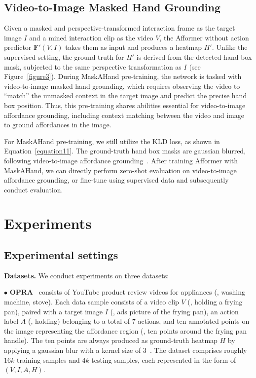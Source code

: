 \documentclass[10pt,twocolumn,letterpaper]{article}
\begin{document}
\subsection{Video-to-Image Masked Hand Grounding}

Given a masked and perspective-transformed interaction frame as the target image $I$ and a mined interaction clip as the video $V$, the Afformer without action predictor $\boldsymbol{F}'(V, I)$ takes them as input and produces a heatmap $H'$. Unlike the supervised setting, the ground truth for $H'$ is derived from the detected hand box mask, subjected to the same perspective transformation as $I$ (see Figure~\ref{figure3}). During MaskAHand pre-training, the network is tasked with video-to-image masked hand grounding, which requires observing the video to ``match'' the unmasked context in the target image and predict the precise hand box position. Thus, this pre-training shares abilities essential for video-to-image affordance grounding, including context matching between the video and image to ground affordances in the image.

For MaskAHand pre-training, we still utilize the KLD loss, as shown in Equation~\ref{equation11}. The ground-truth hand box masks are gaussian blurred, following video-to-image affordance grounding~\cite{demo2vec}. After training Afformer with MaskAHand, we can directly perform zero-shot evaluation on video-to-image affordance grounding, or fine-tune using supervised data and subsequently conduct evaluation.

\section{Experiments}

\subsection{Experimental settings}

\noindent\textbf{Datasets.} We conduct experiments on three datasets:

\noindent
$\bullet$ \textbf{OPRA}~\cite{demo2vec} consists of YouTube product review videos for appliances (\eg, washing machine, stove). Each data sample consists of a video clip $V$ (\eg, holding a frying pan), paired with a target image $I$ (\eg, ads picture of the frying pan), an action label $A$ (\eg, holding) belonging to a total of $7$ actions, and ten annotated points on the image representing the affordance region (\eg, ten points around the frying pan handle). The ten points are always produced as ground-truth heatmap $H$ by applying a gaussian blur with a kernel size of 3~\cite{demo2vec,hotspot,hagnet}. The dataset comprises roughly $16k$ training samples and $4k$ testing samples, each represented in the form of $(V, I, A, H)$.
\end{document}
